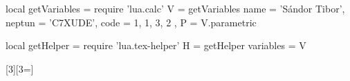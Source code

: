 \usepackage{luacode}

\begin{luacode}
  local getVariables = require 'lua.calc'
  V = getVariables {
      name = 'Sándor Tibor',
      neptun = 'C7XUDE',
      code = { 1, 1, 3, 2 },
    }
  P = V.parametric

  local getHelper = require 'lua.tex-helper'
  H = getHelper {
      variables = V
    }
\end{luacode}

\usepackage{xargs}
\newcommand{\lv}[1]{\directlua{H.printVar [[#1]]}}
\newcommand{\lvec}[2]{\directlua{H.printVec { name="#1", index=#2 }}}
[3][3=]{}
\newcommand{\dv}[1]{\directlua{H.printDirect(#1)}}
